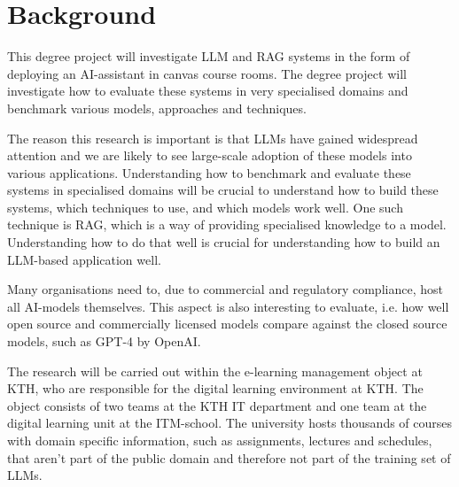 



\section{Background}
\label{sec:background}


This degree project will investigate \gls{LLM} and \gls{RAG} systems in the form of deploying an AI-assistant in canvas course rooms. The degree project will investigate how to evaluate these systems in very specialised domains and benchmark various models, approaches and techniques.

The reason this research is important is that \gls{LLM}s have gained widespread attention and we are likely to see large-scale adoption of these models into various applications. Understanding how to benchmark and evaluate these systems in specialised domains will be crucial to understand how to build these systems, which techniques to use, and which models work well. One such technique is \gls{RAG}, which is a way of providing specialised knowledge to a model. Understanding how to do that well is crucial for understanding how to build an \gls{LLM}-based application well.


Many organisations need to, due to commercial and regulatory compliance, host all AI-models themselves. This aspect is also interesting to evaluate, i.e. how well open source and commercially licensed models compare against the closed source models, such as GPT-4 by OpenAI.




The research will be carried out within the e-learning management object at KTH, who are responsible for the digital learning environment at KTH. The object consists of two teams at the KTH IT department and one team at the digital learning unit at the ITM-school. The university hosts thousands of courses with domain specific information, such as 
assignments, lectures and schedules, that aren’t part of the public domain and therefore not part of the training set of LLMs.


